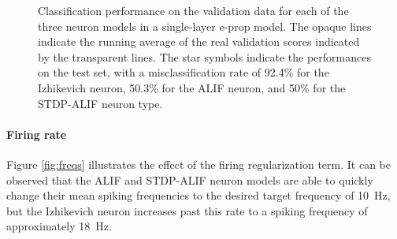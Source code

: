 		\begin{figure}[bth]
		    \myfloatalign
		     \quad
		    \caption[Classification performance for each of the three neuron models in a single-layer e-prop model.]{Classification performance on the validation data for each of the three neuron models in a single-layer e-prop model. The opaque lines indicate the running average of the real validation scores indicated by the transparent lines. The star symbols indicate the performances on the test set, with a misclassification rate of 92.4\% for the Izhikevich neuron, 50.3\% for the ALIF neuron, and 50\% for the STDP-ALIF neuron type.}\label{fig:sl-acc}
		\end{figure}


	\paragraph{Firing rate}
		Figure \ref{fig:freqs} illustrates the effect of the firing regularization term.
		It can be observed that the ALIF and STDP-ALIF neuron models are able to quickly change their mean spiking frequencies to the desired target frequency of \SI{10}{\Hz}, but the Izhikevich neuron increases past this rate to a spiking frequency of approximately \SI{18}{\Hz}.

